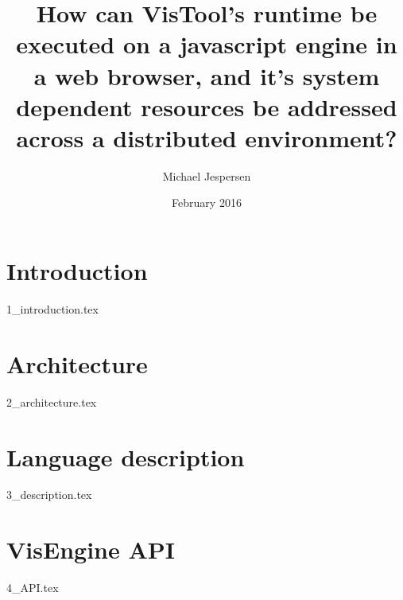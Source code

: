 \documentclass[12pt, a4paper]{article}
\title{How can VisTool's runtime be executed on a javascript engine in a web browser, and it's system dependent resources be addressed across a distributed environment?}
\author{Michael Jespersen}
\date{February 2016}
\begin{document}
\maketitle

\tableofcontents

\section{Introduction}

{1_introduction.tex}

\section{Architecture}
\label{sec:architecture}
{2_architecture.tex}

\section{Language description}
\label{sec:description}
{3_description.tex}

\section{VisEngine API}
\label{sec:API}
{4_API.tex}

\end{document}
